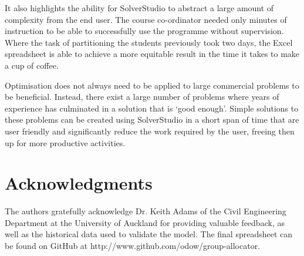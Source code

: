 \documentclass[12pt]{ORSNZ}
\begin{document}
It also highlights the ability for SolverStudio to abstract a large amount of complexity from the end user. The course co-ordinator needed only minutes of instruction to be able to successfully use the programme without supervision. Where the task of partitioning the students previously took two days, the Excel spreadsheet is able to achieve a more equitable result in the time it takes to make a cup of coffee.

Optimisation does not always need to be applied to large commercial problems to be beneficial. Instead, there exist a large number of problems where years of experience has culminated in a solution that is `good enough'. Simple solutions to these problems can be created using SolverStudio in a short span of time that are user friendly and significantly reduce the work required by the user, freeing then up for more productive activities.

\section*{Acknowledgments}
The authors gratefully acknowledge Dr. Keith Adams of the Civil Engineering Department at the University of Auckland for providing valuable feedback, as well as the historical data used to validate the model. The final spreadsheet can be found on GitHub at http://www.github.com/odow/group-allocator.



\end{document}
